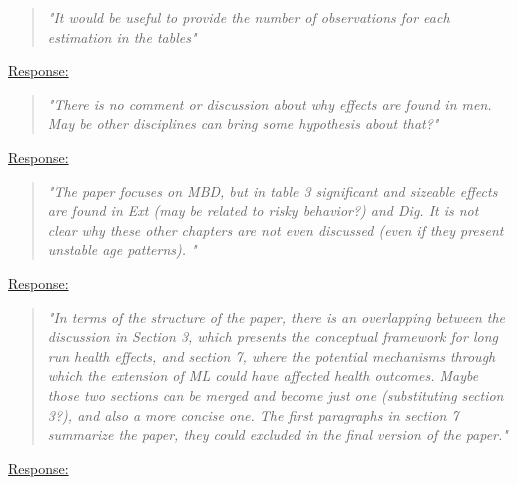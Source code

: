 % 
\begin{quote}
	\textit{"It  would be useful to provide the number of observations for each estimation in the tables"}
\end{quote}
\underline{Response:}

% 
\begin{quote}
	\textit{"There is no comment or discussion about why effects are found in men. May be other disciplines can bring some hypothesis about that?"}
\end{quote}
\underline{Response:}

% 
\begin{quote}
	\textit{"The paper focuses on MBD, but in table 3 significant and sizeable effects are found in Ext (may be related to risky behavior?) and Dig. It is not clear why these other chapters are not even discussed (even if they present unstable age patterns). "}
\end{quote}
\underline{Response:}

\begin{quote}
	\textit{"In terms of the structure of the paper, there is an overlapping between the discussion in Section 3, which presents the conceptual framework for long run health effects, and section 7, where the potential mechanisms through which the extension of ML could have affected health outcomes. Maybe those two sections can be merged and become just one (substituting section 3?), and also a more concise one. The first paragraphs in section 7 summarize the paper, they could excluded in the final version of the paper."}
\end{quote}
\underline{Response:}
